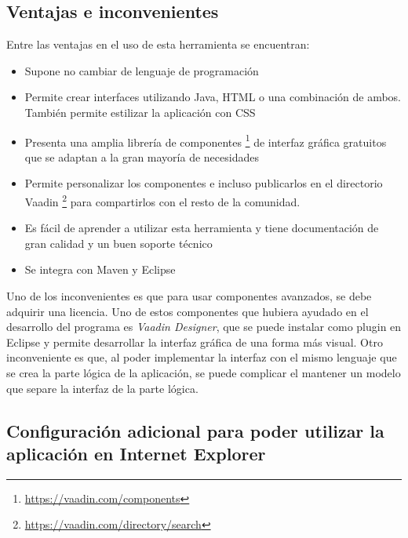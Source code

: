 \subsection{Ventajas e inconvenientes}
Entre las ventajas en el uso de esta herramienta se encuentran:
\begin{itemize}
	\item Supone no cambiar de lenguaje de programación
	\item Permite crear interfaces utilizando Java, HTML o una combinación de ambos. También permite estilizar la aplicación con CSS
	\item Presenta una amplia librería de componentes \footnote{\url{https://vaadin.com/components}} de interfaz gráfica gratuitos que se adaptan a la gran mayoría de necesidades
	\item Permite personalizar los componentes e incluso publicarlos en el directorio Vaadin \footnote{\url{https://vaadin.com/directory/search}} para compartirlos con el resto de la comunidad.
	\item Es fácil de aprender a utilizar esta herramienta y tiene documentación de gran calidad y un buen soporte técnico
	\item Se integra con Maven y Eclipse
\end{itemize}

Uno de los inconvenientes es que para usar componentes avanzados, se debe adquirir una licencia. Uno de estos componentes que hubiera ayudado en el desarrollo del programa es \textit{Vaadin Designer}, que se puede instalar como plugin en Eclipse y permite desarrollar la interfaz gráfica de una forma más visual. Otro inconveniente es que, al poder implementar la interfaz con el mismo lenguaje que se crea la parte lógica de la aplicación, se puede complicar el mantener un modelo que separe la interfaz de la parte lógica.

\subsection{Configuración adicional para poder utilizar la aplicación en Internet Explorer}

